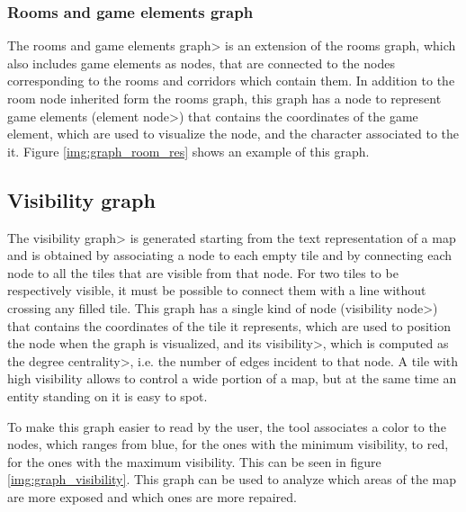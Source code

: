 \subsubsection{Rooms and game elements graph}

The \<rooms and game elements graph> is an extension of the rooms graph, which also includes game elements as nodes, that are connected to the nodes corresponding to the rooms and corridors which contain them. In addition to the room node inherited form the rooms graph, this graph has a node to represent game elements (\<element node>) that contains the coordinates of the game element, which are used to visualize the node, and the character associated to the it. Figure \ref{img:graph_room_res} shows an example of this graph.

\subsection{Visibility graph}

The \<visibility graph> is generated starting from the text representation of a map and is obtained by associating a node to each empty tile and by connecting each node to all the tiles that are visible from that node. For two tiles to be respectively visible, it must be possible to connect them with a line without crossing any filled tile. This graph has a single kind of node (\<visibility node>) that contains the coordinates of the tile it represents, which are used to position the node when the graph is visualized, and its \<visibility>, which is computed as the \<degree centrality>, i.e. the number of edges incident to that node. A tile with high visibility allows to control a wide portion of a map, but at the same time an entity standing on it is easy to spot.

\par

To make this graph easier to read by the user, the tool associates a color to the nodes, which ranges from blue, for the ones with the minimum visibility, to red, for the ones with the maximum visibility. This can be seen in figure \ref{img:graph_visibility}. This graph can be used to analyze which areas of the map are more exposed and which ones are more repaired.

